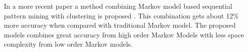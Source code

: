 In a more recent paper a method combining Markov model based sequential pattern
mining with clustering is proposed \cite{Anitha_anew}. This combination gets
about 12\% more accuracy when compared with traditional Markov model.
The proposed models combines great accuracy from high order Markov Models with
less space complexity from low order Markov models.


